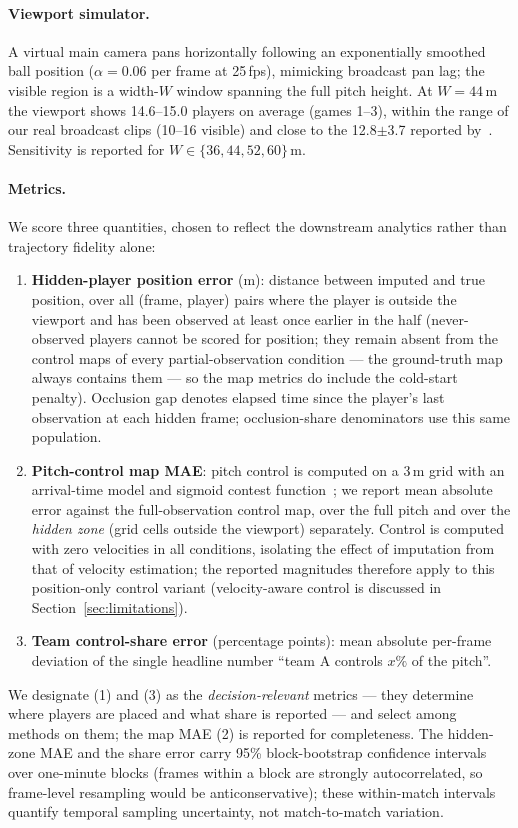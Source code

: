 \documentclass[11pt]{article}
\begin{document}
\paragraph{Viewport simulator.}
A virtual main camera pans horizontally following an exponentially smoothed ball
position ($\alpha = 0.06$ per frame at 25\,fps), mimicking broadcast pan lag; the visible region is a width-$W$ window spanning the full
pitch height. At $W = 44$\,m the viewport shows 14.6--15.0 players on average
(games 1--3), within the range of our real broadcast clips (10--16 visible) and
close to the 12.8$\pm$3.7 reported by~\citet{omidshafiei2022}. Sensitivity is reported for
$W \in \{36, 44, 52, 60\}$\,m.

\paragraph{Metrics.}
We score three quantities, chosen to reflect the downstream analytics rather
than trajectory fidelity alone:
\begin{enumerate}
\item \textbf{Hidden-player position error} (m): distance between imputed and
true position, over all (frame, player) pairs where the player is outside the
viewport and has been observed at least once earlier in the half
(never-observed players cannot be scored for position; they remain absent from
the control maps of every partial-observation condition --- the ground-truth
map always contains them --- so the map metrics do include the cold-start
penalty). Occlusion gap denotes elapsed time since the player's last
observation at each hidden frame; occlusion-share denominators use this same
population.
\item \textbf{Pitch-control map MAE}: pitch control is computed on a 3\,m grid
with an arrival-time model and sigmoid contest
function~\citep{spearman2017physics}; we report mean absolute error against the
full-observation control map, over the full pitch and over the \emph{hidden
zone} (grid cells outside the viewport) separately. Control is computed with
zero velocities in all conditions, isolating the effect of imputation from that
of velocity estimation; the reported magnitudes therefore apply to this
position-only control variant (velocity-aware control is discussed in
Section~\ref{sec:limitations}).
\item \textbf{Team control-share error} (percentage points): mean absolute
per-frame deviation of the single headline number ``team A controls $x\%$ of
the pitch''.
\end{enumerate}
We designate (1) and (3) as the \emph{decision-relevant} metrics --- they
determine where players are placed and what share is reported --- and select
among methods on them; the map MAE (2) is reported for completeness. The hidden-zone MAE and the share error carry 95\%
block-bootstrap confidence intervals over one-minute blocks (frames within a
block are strongly autocorrelated, so frame-level resampling would be
anticonservative); these within-match intervals quantify temporal sampling
uncertainty, not match-to-match variation.
\end{document}
